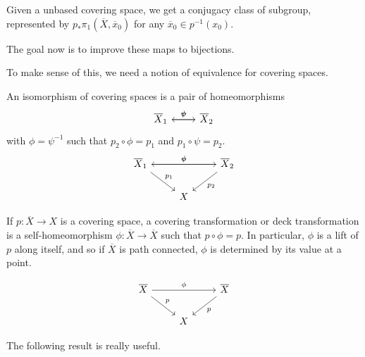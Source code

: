 \documentclass{article}
\numberwithin{nthm}{subsection}
\begin{document}
Given a unbased covering space, we get a conjugacy class of subgroup, represented by $p_* \pi_1(\overline{X},\overline{x}_0)$ for any $\overline{x}_0 \in p^{-1}(x_0)$.

The goal now is to improve these maps to bijections.

To make sense of this, we need a notion of equivalence for covering spaces.

\begin{defi}
    An isomorphism of covering spaces is a pair of homeomorphisms
    \begin{equation*}
        \begin{tikzcd}
            \overline{X}_1 \arrow[r, "\phi"] & \overline{X}_2 \arrow[l, "\psi"']
        \end{tikzcd}
    \end{equation*}
    with $\phi = \psi^{-1}$ such that $p_2 \circ \phi = p_1$ and $p_1 \circ \psi = p_2$.
    \begin{equation*}
        \begin{tikzcd}
            \overline{X}_1 \arrow[rr, "\phi"] \arrow[rd, "p_1"] & & \overline{X}_2 \arrow[ll, "\psi"'] \arrow[ld, "p_2"] \\
                                             & X &
        \end{tikzcd}
    \end{equation*}
\end{defi}

\begin{defi}
    If $p: \overline{X} \to X$ is a covering space, a covering transformation or deck transformation is a self-homeomorphism $\phi: \overline{X} \to \overline{X}$ such that $p \circ \phi = p$.
    In particular, $\phi$ is a lift of $p$ along itself, and so if $\overline{X}$ is path connected, $\phi$ is determined by its value at a point.

    \begin{equation*}
        \begin{tikzcd}
            \overline{X} \arrow[rr, "\phi"] \arrow[rd, "p"] & & \overline{X} \arrow[ld, "p"] \\
                                             & X &
        \end{tikzcd}
    \end{equation*}
\end{defi}

The following result is really useful.
%
\end{document}
